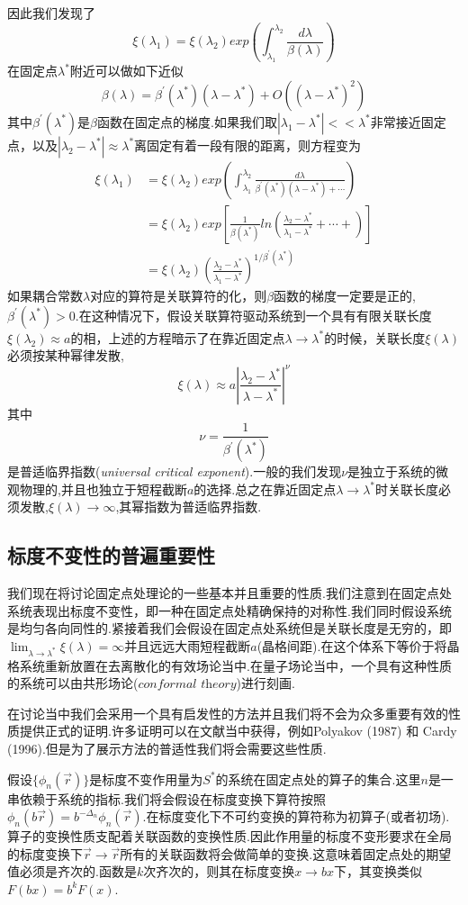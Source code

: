 \documentclass{ctexart}
\begin{document}
因此我们发现了$$\xi(\lambda_1)=\xi(\lambda_2)exp\left(\int_{\lambda_1}^{\lambda_2}\frac{d\lambda}{\beta(\lambda)}\right)$$
在固定点$\lambda^*$附近可以做如下近似
$$\beta(\lambda)=\beta^\prime(\lambda^*)(\lambda-\lambda^*)+O((\lambda-\lambda^*)^2)$$
其中$\beta^\prime(\lambda^*)$是$\beta$函数在固定点的梯度.如果我们取$|\lambda_1-\lambda^*|<<\lambda^*$非常接近固定点，以及$|\lambda_2-\lambda^*|\approx\lambda^*$离固定有着一段有限的距离，则方程变为
\begin{align*}
    \xi(\lambda_1) & =\xi(\lambda_2)exp\left(\int_{\lambda_1}^{\lambda_2}\frac{d\lambda}{\beta^\prime(\lambda^*)(\lambda-\lambda^*)+\cdots}\right)\\
    & =\xi(\lambda_2)exp\left[\frac{1}{\beta (\lambda^*)}ln\left(\frac{\lambda_2-\lambda^*}{\lambda_1-\lambda^*}+\cdots+\right)\right]\\
    & =\xi(\lambda_2)\left(\frac{\lambda_2-\lambda^*}{\lambda_1-\lambda^*}\right)^{1/\beta^\prime(\lambda^*)}
\end{align*}
如果耦合常数$\lambda$对应的算符是关联算符的化，则$\beta$函数的梯度一定要是正的,$\beta^\prime(\lambda^*)>0$.在这种情况下，假设关联算符驱动系统到一个具有有限关联长度 $\xi(\lambda_2)\approx a$的相，上述的方程暗示了在靠近固定点$\lambda\rightarrow \lambda^*$的时候，关联长度$\xi(\lambda)$必须按某种幂律发散,
$$\xi(\lambda)\approx a
\left|\frac{\lambda_2-\lambda^*}{\lambda-\lambda^*}\right|^{\nu}$$
其中$$\nu=\frac{1}{\beta^\prime(\lambda^*)}$$
是普适临界指数(\textit{universal critical exponent}).一般的我们发现$\nu$是独立于系统的微观物理的,并且也独立于短程截断$a$的选择.总之在靠近固定点$\lambda\rightarrow\lambda^*$时关联长度必须发散,$\xi(\lambda)\rightarrow\infty$,其幂指数为普适临界指数.\par 
\subsection{标度不变性的普遍重要性}
我们现在将讨论固定点处理论的一些基本并且重要的性质.我们注意到在固定点处系统表现出标度不变性，即一种在固定点处精确保持的对称性.我们同时假设系统是均匀各向同性的.紧接着我们会假设在固定点处系统但是关联长度是无穷的，即$\lim_{\lambda\rightarrow \lambda^*}\xi(\lambda)=\infty$并且远远大雨短程截断$a$(晶格间距).在这个体系下等价于将晶格系统重新放置在去离散化的有效场论当中.在量子场论当中，一个具有这种性质的系统可以由共形场论($\textit{conformal theory}$)进行刻画.\par 
在讨论当中我们会采用一个具有启发性的方法并且我们将不会为众多重要有效的性质提供正式的证明.许多证明可以在文献当中获得，例如Polyakov (1987) 和 Cardy (1996).但是为了展示方法的普适性我们将会需要这些性质.\par 
假设$\{\phi_n(\vec{r})\}$是标度不变作用量为$S^*$的系统在固定点处的算子的集合.这里$n$是一串依赖于系统的指标.我们将会假设在标度变换下算符按照$\phi_n(b\vec{r})=b^{-\Delta_n}\phi_n(\vec{r})$.在标度变化下不可约变换的算符称为初算子(或者初场).算子的变换性质支配着关联函数的变换性质.因此作用量的标度不变形要求在全局的标度变换下$\vec{r}\rightarrow\vec{r}$所有的关联函数将会做简单的变换.这意味着固定点处的期望值必须是齐次的.函数是$k$次齐次的，则其在标度变换$x\rightarrow bx$下，其变换类似$F(bx)=b^kF(x)$.\par 
\end{document}
